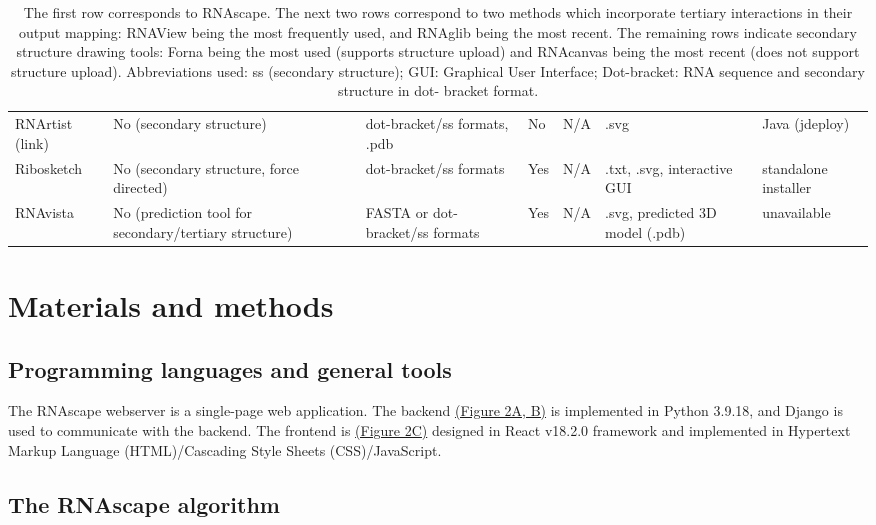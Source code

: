 \begin{table}[]
{\begin{tabular}{lllllll}
RNArtist (link) & No (secondary structure) & dot-bracket/ss formats, .pdb & No & N/A & .svg & Java (jdeploy) \\
Ribosketch \citep{Lu2018} & No (secondary structure, force   directed) & dot-bracket/ss formats & Yes & N/A & .txt, .svg, interactive GUI & standalone installer \\
RNAvista \citep{antczak2019rnavista} & No (prediction tool for secondary/tertiary   structure) & FASTA or dot-bracket/ss formats & Yes & N/A & .svg, predicted 3D model (.pdb) & unavailable
\end{tabular}%
}
\caption[escription of various attributes of relevant tools which produce 2D
visualizations of RNA.]{The first row corresponds to RNAscape. The next two rows correspond to two
methods which incorporate tertiary interactions in their output mapping: RNAView \citep{Yang2003} being the most
frequently used, and RNAglib \citep{Mallet2022} being the most recent. The remaining rows indicate secondary
structure drawing tools: Forna \citep{Kerpedjiev2015} being the most used (supports structure upload) and RNAcanvas \citep{Johnson2023} being the most recent (does not support structure upload). Abbreviations used: ss (secondary
structure); GUI: Graphical User Interface; Dot-bracket: RNA sequence and secondary structure in dot-
bracket format.}
\end{table}

\section{Materials and methods} 

\subsection{Programming languages and general tools}

The RNAscape webserver is a single-page web application. The backend \hyperref[fig:rnascape2]{(Figure 2A, B)} is implemented in Python 3.9.18, and Django \citep{Django2019} is used to communicate with the backend. The frontend is \hyperref[fig:rnascape2]{(Figure 2C)} designed in React v18.2.0 framework and implemented in Hypertext Markup Language (HTML)/Cascading Style Sheets (CSS)/JavaScript.

\subsection{The RNAscape algorithm}


